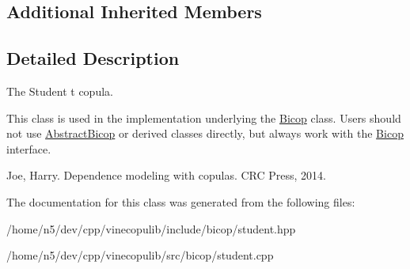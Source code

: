 \subsection*{Additional Inherited Members}


\subsection{Detailed Description}
The Student t copula. 

This class is used in the implementation underlying the \hyperlink{classvinecopulib_1_1_bicop}{Bicop} class. Users should not use \hyperlink{classvinecopulib_1_1_abstract_bicop}{Abstract\+Bicop} or derived classes directly, but always work with the \hyperlink{classvinecopulib_1_1_bicop}{Bicop} interface.

Joe, Harry. Dependence modeling with copulas. C\+RC Press, 2014. 

The documentation for this class was generated from the following files\+:\begin{DoxyCompactItemize}
\item 
/home/n5/dev/cpp/vinecopulib/include/bicop/student.\+hpp\item 
/home/n5/dev/cpp/vinecopulib/src/bicop/student.\+cpp\end{DoxyCompactItemize}
